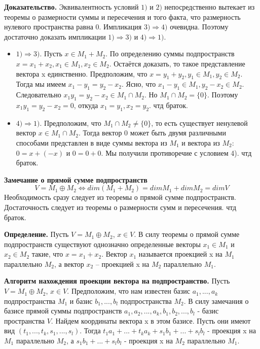 \documentclass[a4paper]{article}
\begin{document}
\begin{hproof}
\textbf{Доказательство.} Эквивалентность условий $1)$ и $2)$ непосредственно
вытекает из теоремы о размерности суммы и пересечения и того факта,
что размерность нулевого пространства равна 0. Импликация $3) \Rightarrow 4)$
очевидна. Поэтому достаточно доказать импликации $1) \Rightarrow 3)$ и $4) \Rightarrow 1)$.

\begin{itemize}
\item $1) \Rightarrow 3)$. Пусть $x \in M_1 + M_2$. По определению суммы подпространств $x = x_1 + x_2, x_1 \in M_1, x_2 \in M_2$. Остаётся доказать, то такое представление вектора x единственно. Предположим, что $x = y_1 + y_2, y_1 \in M_1, y_2 \in M_2$. Тогда мы имеем $x_1-y_1 = y_2 - x_2$. Ясно, что $x_1 - y_1 \in M_1, y_2-x_2 \in M_2$. Следовательно $x_1y_1 = y_2 - x_2 \in M_1 \cap M_2$.
Но $M_1 \cap M_2 = \{ 0 \}$. Поэтому $x_1y_1 = y_2 - x_2 = 0$, откуда $x_1 = y_1, x_2 = y_2$. чтд браток.

\item $4) \Rightarrow 1)$. Предположим, что $M_1 \cap M_2 \neq \{ 0 \}$, то есть существует ненулевой вектор $x \in M_1 \cap M_2$. Тогда вектор 0 может быть двумя различными способами представлен в виде суммы вектора из $M_1$ и вектора из $M_2$: $0 = x+(-x)$ и $0 = 0+0$. Мы получили противоречие с условием 4). чтд браток.
\end{itemize}
\end{hproof}

\begin{htheorem}
\textbf{Замечание о прямой сумме подпространств} \begin{equation}
V = M_1 \oplus M_2 \Leftrightarrow dim(M_1 + M_2) = dim M_1 + dim M_2 = dim V
\end{equation}
Необходимость сразу следует из теоремы о прямой сумме подпространств.
Достаточность следует из теоремы о размерности сумм и пересечения. чтд браток.
\end{htheorem}

\textbf{Определение.}  Пусть $V = M_1 \oplus M_2$, $x \in V$. В силу теоремы о прямой сумме подпространств существуют однозначно определенные векторы $x_1 \in M_1$ и
$x_2 \in M_2$ такие, что $x = x_1 + x_2$. Вектор $x_1$ называется проекцией x на $M_1$
параллельно $M_2$, а вектор $x_2$ – проекцией x на $M_2$ параллельно $M_1$.
 


\textbf{Алгоритм нахождения проекции вектора на подпространство.} Пусть $V = M_1 \oplus M_2$, $x \in V$. Предположим, что нам известен базис $a_1, ..., a_k$ подпространства $M_1$ и базис $b_1, ..., b_l$ подпространства $M_2$. В силу замечания о базисе прямой суммы подпространств $a_1, a_2, ..., a_k, b_1, b_2, ... ,b_l$ - базис пространства $V$. Найдем координаты вектора x в этом базисе. Пусть они имеют вид $(t_1, ..., t_k, s_1, ..., s_l)$. Тогда $t_1a_1 + ... + t_ka_k + s_1b_1 + ... + s_lb_l$ - проекция x на $M_1$ параллельно $M_2$, а $s_1b_1 + ... + s_lb_l$ - проекция x на $M_2$ параллельно $M_1$.
\end{document}
